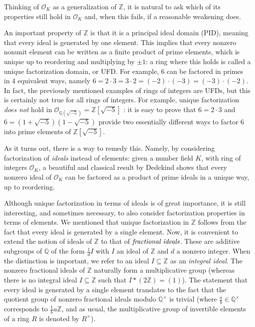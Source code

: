 \documentclass[sn-mathphys]{sn-jnl}%
\newcommand*{\OK}[1][K]{\mathcal{O}_{#1}}
\newcommand{\QQ}{\mathbb{Q}}
\renewcommand{\Z}{\mathbb{Z}}
\begin{document}
Thinking of $\OK$ as a generalization of $\Z$, it is natural to ask which of its properties
still hold in $\OK$ and, when this fails, if a reasonable weakening does.

An important property of $\Z$ is that it is a principal ideal domain (PID), meaning that every ideal is generated by one element. This implies that every nonzero nonunit element can be written as a
finite product of prime elements, which is unique up to reordering and multiplying by $\pm 1$: a ring where this holds is called a unique factorization domain, or UFD.
For example, $6$ can be factored in primes in $4$ equivalent ways, namely $6=2\cdot 3=3\cdot2=(-2)\cdot (-3)=(-3) \cdot (-2)$.
In fact, the previously mentioned examples of rings of integers are UFDs, but this is certainly not true for all rings of integers. For example, unique factorization \emph{does not} hold in $\mathcal{O}_{\QQ(\sqrt{-5})}=\Z[\sqrt{-5}]$
: it is easy to prove that $6=2\cdot3$ and $6=(1+\sqrt{-5}) (1-\sqrt{-5})$ provide two essentially different ways to factor $6$ into prime elements of $\Z[\sqrt{-5}]$.

As it turns out, there is a way to remedy this. Namely, by considering factorization of \emph{ideals} instead of elements: given a number field $K$, with ring of integers $\OK$, a beautiful and classical result by Dedekind shows that every nonzero ideal of $\OK$ can be factored as a product of prime ideals in a unique way, up to reordering.

Although unique factorization in terms of ideals is of great importance, it is still interesting, and sometimes
necessary, to also consider factorization properties in terms of elements.
We mentioned that unique factorization in $\Z$ follows from the fact that every ideal is generated by a single element.
Now, it is convenient to extend the notion of ideals of $\Z$ to that of $\emph{fractional ideals}$. 
These are additive subgroups of $\QQ$ of the form $\frac{1}{d} I$ with $I$ an ideal of $\Z$ and $d$ a nonzero integer.
When the distinction is important, we refer to an ideal $I \subseteq \Z$ as an \emph{integral ideal}.
The nonzero fractional ideals of $\Z$ naturally form a multiplicative group (whereas there is no integral ideal $I\subseteq \Z$ such that $I*(2\Z)=(1)$).
The statement that every ideal is generated by a single element
translates to the fact that the quotient group of nonzero fractional ideals modulo $\QQ^\times$ is trivial (where $\frac{a}{b} \in \QQ^\times$ corresponds to $\frac{1}{b} a \Z$, and as usual, the multiplicative group of invertible elements of a ring $R$ is denoted by $R^{\times}$).
\end{document}
